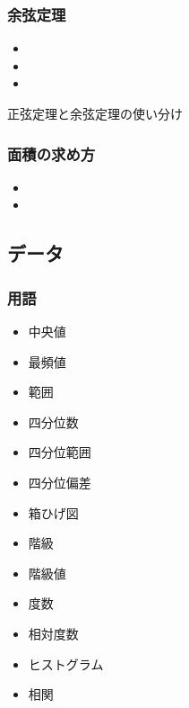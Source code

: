 \documentclass[10pt,dvipdfmx]{jsarticle}
\begin{document}
\subsubsection*{余弦定理}
\begin{Large}
  \begin{itemize}
    \item  \item  \item
  \end{itemize}
\end{Large}

\begin{itembox}[l]{正弦定理と余弦定理の使い分け}
  \vspace{8mm}
\end{itembox}


\subsubsection*{面積の求め方}
\begin{multicols}{2}
  \begin{Large}
    \begin{itemize}
      \item  \item
    \end{itemize}
  \end{Large}
\end{multicols}


\subsection*{データ}
\subsubsection*{用語}
\begin{Large}
  \begin{itemize}
    \item 中央値
    \item 最頻値
    \item 範囲
    \item 四分位数
    \item 四分位範囲
    \item 四分位偏差
    \item 箱ひげ図
    \item 階級
    \item 階級値
    \item 度数
    \item 相対度数
    \item ヒストグラム
    \item 相関
  \end{itemize}
\end{Large}
\end{document}
